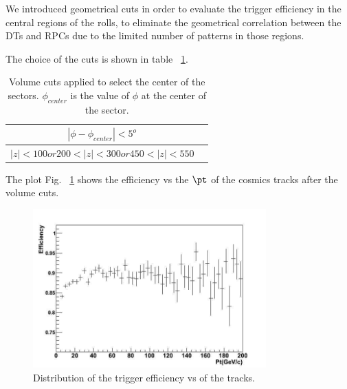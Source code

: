 
We introduced geometrical cuts in order to evaluate the trigger efficiency 
in the central regions of the rolls, to eliminate the geometrical correlation 
between the DTs and RPCs due to the limited number of patterns in those regions.

The choice of the cuts is shown in table ~\ref{tab:volumecuts}. 

 \begin{table}[htb]
    \begin{center}
      \begin{tabular}{|c|c|} \hline
  $   |\phi - \phi_{center} | < 5^o $ & \\ \hline
  $  |z| < 100 or 200 < |z| < 300 or 450 < |z| < 550$  &  \\ \hline
      \end{tabular}
      \caption{Volume cuts applied to select the center of the sectors.
       $\phi_{center}$ is the value of $\phi$ at the center of the sector. 
}
    \label{tab:volumecuts}
    \end{center}
  \end{table}

The plot Fig. ~\ref{fig:eff_pt_08} shows the efficiency vs
 the $\pt$ of the cosmics tracks after 
the volume cuts.

\begin{figure}[hbtp]
  \begin{center}
    \includegraphics[width=0.8\textwidth]{eff_pt_08}
    \hspace{1cm}
    \caption{Distribution of the trigger efficiency vs \pt of the tracks.}
    \label{fig:eff_pt_08}
  \end{center}
\end{figure}


